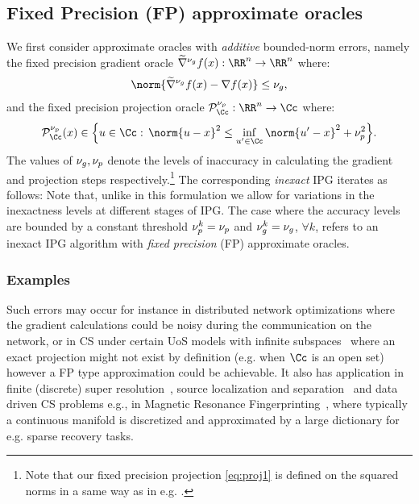 \subsection{Fixed Precision (FP) approximate oracles}
\label{sec:FP}
We first consider 
approximate oracles with \emph{additive} bounded-norm 
errors, namely the fixed precision gradient oracle $\nablaa^{\nug} f(x):\RR^n\rightarrow \RR^n$ where:
\begin{align}
\norm{\nablaa^{\nug} f(x) -\nabla f(x)}\leq \nug, \label{eq:grad} 
\end{align}
and the fixed precision projection oracle $\pp_\Cc^{\nup}:\RR^n\rightarrow\Cc$ where:
\begin{align}
\pp_\Cc^{\nup}(x) \in \Big\{ u\in \Cc :\,	\norm{u-x}^2 \leq \inf_{u'\in \Cc}\norm{u'-x}^2 +\nup^2  \Big\}.\label{eq:proj1}
\end{align} 
The values of $\nu_g,\nu_p$ denote the levels of inaccuracy in calculating the gradient and projection steps respectively.\footnote{Note that our fixed precision projection \eqref{eq:proj1} is defined on the squared norms in a same way as in e.g. \cite{Blumen,MIP}. %
	} 
The corresponding \emph{inexact} IPG
iterates as follows:
\eql{\label{eq:inIP} x^k = \pp^{\nup^k}_{\Cc}\left(x^{k-1}
	-\mu \nablaa^{\nug^k} f(x^{k-1})\right).}
Note that, unlike \cite{Blumen,MIP} in this formulation we allow for variations in the inexactness levels at different stages of IPG. %
The case where the accuracy levels are bounded by a constant threshold $\nu_p^k=\nu_p$ and $\nu_g^k=\nu_g$, $\forall k$, refers to an inexact IPG algorithm with \emph{fixed precision} (FP) approximate oracles.

\subsubsection*{Examples}
Such errors may occur for instance in distributed network
optimizations where the gradient calculations could be noisy during the communication on the network, or in CS under certain UoS models with infinite subspaces~\cite{Blumen}  where an exact projection might not exist by definition (e.g. when $\Cc$ is an open set) however a FP type approximation could be achievable. It also has application in finite (discrete) super resolution~\cite{recht:discretize}, source localization and separation~\cite{TASL14,SCOOP} and data driven CS problems e.g., in Magnetic Resonance Fingerprinting~\cite{MRF,BLIPsiam},  where typically a continuous manifold is discretized and approximated  by a large dictionary for e.g. sparse recovery tasks.

